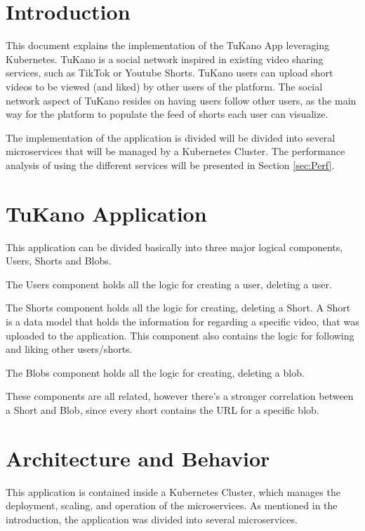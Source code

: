 \documentclass[10pt,a4paper,twocolumn]{article}
\title{\titulo}
\date{\data}
\author{\name\\ \institution}
\begin{document}

\maketitle

\section{Introduction}
\label{sec:intro}
This document explains the implementation of the TuKano App leveraging Kubernetes{\cite {kubernetes}}. TuKano is a social network inspired in existing video sharing services, such as TikTok or Youtube Shorts. TuKano users can upload short videos to be viewed (and liked) by other users of the platform. The social network aspect of TuKano resides on having users follow other users, as the main way for the platform to populate the feed of shorts each user can visualize.
\par The implementation of the application is divided will be divided into several microservices that will be managed by a Kubernetes Cluster. The performance analysis of using the different services will be presented in Section \ref{sec:Perf}.

\section{TuKano Application}
\label{sec:application}
This application can be divided basically into three major logical components, Users, Shorts and Blobs. 
\par The Users component holds all the logic for creating a user, deleting a user.
\par The Shorts component holds all the logic for creating, deleting a Short. A Short is a data model that holds the information for regarding a specific video, that was uploaded to the application. This component also contains the logic for following and liking other users/shorts.
\par The Blobs component holds all the logic for creating, deleting a blob.
\par These components are all related, however there's a stronger correlation between a Short and Blob, since every short contains the URL for a specific blob.

\section{Architecture and Behavior}
\label{sec:architecture}
This application is contained inside a Kubernetes Cluster, which manages the deployment, scaling, and operation of the microservices. As mentioned in the introduction, the application was divided into several microservices. 
\end{document}
